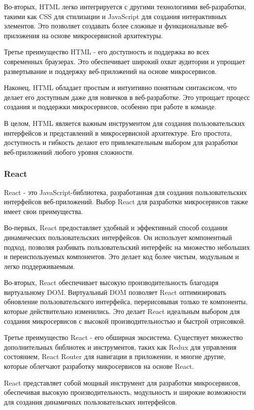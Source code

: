 Во-вторых, HTML легко интегрируется с другими технологиями веб-разработки, такими как CSS для стилизации и JavaScript для создания интерактивных элементов. Это позволяет создавать более сложные и функциональные веб-приложения на основе микросервисной архитектуры.

Третье преимущество HTML - его доступность и поддержка во всех современных браузерах. Это обеспечивает широкий охват аудитории и упрощает развертывание и поддержку веб-приложений на основе микросервисов.

Наконец, HTML обладает простым и интуитивно понятным синтаксисом, что делает его доступным даже для новичков в веб-разработке. Это упрощает процесс создания и поддержки микросервисов, особенно при работе в команде.

В целом, HTML является важным инструментом для создания пользовательских интерфейсов и представлений в микросервисной архитектуре. Его простота, доступность и гибкость делают его привлекательным выбором для разработки веб-приложений любого уровня сложности.

\subsubsection{React}

React - это JavaScript-библиотека, разработанная для создания пользовательских интерфейсов веб-приложений. Выбор React для разработки микросервисов также имеет свои преимущества.

Во-первых, React предоставляет удобный и эффективный способ создания динамических пользовательских интерфейсов. Он использует компонентный подход, позволяя разбивать пользовательский интерфейс на множество небольших и переиспользуемых компонентов. Это делает код более чистым, модульным и легко поддерживаемым.

Во-вторых, React обеспечивает высокую производительность благодаря виртуальному DOM. Виртуальный DOM позволяет React оптимизировать обновление пользовательского интерфейса, перерисовывая только те компоненты, которые действительно изменились. Это делает React идеальным выбором для создания микросервисов с высокой производительностью и быстрой отрисовкой.

Третье преимущество React - его обширная экосистема. Существует множество дополнительных библиотек и инструментов, таких как Redux для управления состоянием, React Router для навигации в приложении, и многие другие, которые облегчают разработку микросервисов на основе React.

 React представляет собой мощный инструмент для разработки микросервисов, обеспечивая высокую производительность, модульность и широкие возможности для создания динамичных пользовательских интерфейсов.